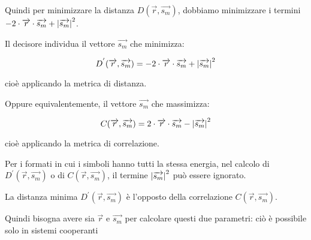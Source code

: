 Quindi per minimizzare la distanza $ D(\overrightarrow{r}, \overrightarrow{s_m}) $, 
dobbiamo minimizzare i termini $- 2 \cdot \overrightarrow{r} \cdot \overrightarrow{s_m} + \abs{\overrightarrow{s_m}}^{2}$. \newline 

Il decisore individua il vettore $\overrightarrow{s_m}$ che minimizza: 

{
    \Large 
    \begin{equation}
        D^{'} (\overrightarrow{r}, \overrightarrow{s_m}) 
        = 
        - 2 \cdot \overrightarrow{r} \cdot \overrightarrow{s_m} + \abs{\overrightarrow{s_m}}^{2}
    \end{equation}
}

cioè applicando la metrica di distanza. \newline 

Oppure equivalentemente, il vettore $\overrightarrow{s_m}$ che massimizza: 

{
    \Large 
    \begin{equation}
        C(\overrightarrow{r}, \overrightarrow{s_m})
        = 
        2 \cdot \overrightarrow{r} \cdot \overrightarrow{s_m} - \abs{\overrightarrow{s_m}}^{2}
    \end{equation}
}

cioè applicando la metrica di correlazione. \newline 

Per i formati in cui i simboli hanno tutti la stessa energia, 
nel calcolo di $D^{'} (\overrightarrow{r}, \overrightarrow{s_m}) $ o di $C(\overrightarrow{r}, \overrightarrow{s_m})$, 
il termine $\abs{\overrightarrow{s_m}}^{2}$ può essere ignorato. \newline 

\begin{tcolorbox}
La distanza minima $D^{'} (\overrightarrow{r}, \overrightarrow{s_m}) $ è l'opposto della correlazione  $C(\overrightarrow{r}, \overrightarrow{s_m})$. \newline 

Quindi bisogna avere sia $\overrightarrow{r}$ e $\overrightarrow{s_m}$ per calcolare questi due parametri: 
ciò è possibile solo in sistemi cooperanti
\end{tcolorbox}

\iffalse
\newpage 

\subsubsection{MAP sulla 2-PAM}
\footnote{Slide del prof | Ricevitore numerico | pag 10.2 \\  
Appunti di Damiano | pag 10.2 
}

\begin{tcolorbox}
    Di seguito un esempio della MAP sulla 2-PAM. \newline 

    Sono formule, quindi puoi ignorarle.
\end{tcolorbox}

\begin{tcolorbox}[colback=green!5!white,colframe=green!75!black]
    TO-DO: FARE DA PAG 11 A PAG 19 DEL PDF E RICOPIARLE QUI
\end{tcolorbox}
\fi 

\newpage 

